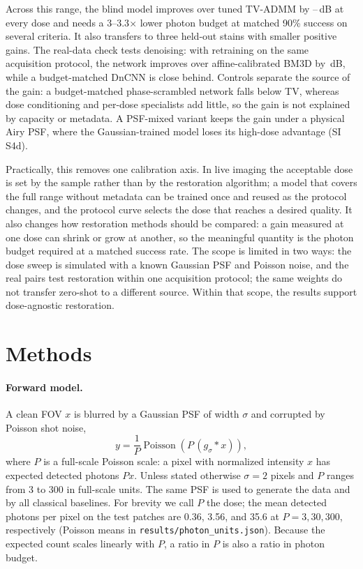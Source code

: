 \documentclass[10pt]{article}
\begin{document}
Across this range, the blind model improves over tuned TV-ADMM by
\BestGainMin--\BestGainMax\,dB at every dose and needs a 3--3.3$\times$ lower
photon budget at matched 90\% success on several criteria. It also transfers to
three held-out stains with smaller positive gains. The real-data check tests
denoising: with retraining on the same acquisition protocol, the network
improves over affine-calibrated BM3D by \RealGain\,dB, while a budget-matched
DnCNN is close behind. Controls separate the source of the gain: a
budget-matched phase-scrambled network falls below TV, whereas dose
conditioning and per-dose specialists add little, so the gain is not explained
by capacity or metadata. A PSF-mixed variant keeps the gain under a physical Airy PSF,
where the Gaussian-trained model loses its high-dose advantage (SI S4d).

Practically, this removes one calibration axis. In live imaging the acceptable
dose is set by the sample rather than by the restoration algorithm; a model
that covers the full range without metadata can be trained once and reused as
the protocol changes, and the protocol curve selects the dose that reaches a
desired quality. It also changes how restoration methods should be compared: a
gain measured at one dose can shrink or grow at another, so the meaningful
quantity is the photon budget required at a matched success rate. The scope is limited in two ways: the dose sweep is simulated with a
known Gaussian PSF and Poisson noise, and the real pairs test restoration
within one acquisition protocol; the same weights do not transfer zero-shot to
a different source. Within that scope, the results support dose-agnostic
restoration.

\section{Methods}
\paragraph{Forward model.}
A clean FOV $x$ is blurred by a Gaussian PSF of width $\sigma$ and corrupted by
Poisson shot noise,
\begin{equation}
y = \frac{1}{P}\operatorname{Poisson}\!\left(P\,(g_\sigma * x)\right),
\label{eq:forward}
\end{equation}
where $P$ is a full-scale Poisson scale: a pixel with normalized intensity $x$
has expected detected photons $Px$. Unless stated otherwise $\sigma=2$ pixels
and $P$ ranges from 3 to 300 in full-scale units. The same PSF is used to generate the
data and by all classical baselines. For brevity we call $P$ the dose; the
mean detected photons per pixel on the test patches are 0.36, 3.56, and 35.6
at $P=3,30,300$, respectively (Poisson means in
\texttt{results/photon\_units.json}). Because the expected count scales
linearly with $P$, a ratio in $P$ is also a ratio in photon budget.
\end{document}
